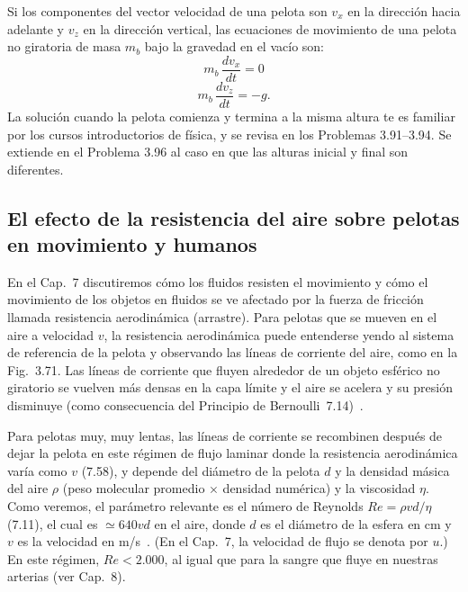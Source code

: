 \documentclass[12pt]{book}
\begin{document}
Si los componentes del vector velocidad de una pelota son $v_x$ en la dirección hacia adelante y $v_z$ en la dirección vertical, las ecuaciones de movimiento de una pelota no giratoria de masa $m_b$ bajo la gravedad en el vacío son:
\begin{equation}
m_b\,\frac{dv_x}{dt} = 0
\label{eq:3.134}
\end{equation}
\begin{equation}
m_b\,\frac{dv_z}{dt} = -g.
\label{eq:3.135}
\end{equation}
La solución cuando la pelota comienza y termina a la misma altura te es familiar por los cursos introductorios de física, y se revisa en los Problemas 3.91--3.94. Se extiende en el Problema 3.96 al caso en que las alturas inicial y final son diferentes.

\subsection{El efecto de la resistencia del aire sobre pelotas en movimiento y humanos}

En el Cap.~7 discutiremos cómo los fluidos resisten el movimiento y cómo el movimiento de los objetos en fluidos se ve afectado por la fuerza de fricción llamada resistencia aerodinámica (arrastre). Para pelotas que se mueven en el aire a velocidad $v$, la resistencia aerodinámica puede entenderse yendo al sistema de referencia de la pelota y observando las líneas de corriente del aire, como en la Fig.~3.71. Las líneas de corriente que fluyen alrededor de un objeto esférico no giratorio se vuelven más densas en la capa límite y el aire se acelera y su presión disminuye (como consecuencia del Principio de Bernoulli~7.14)~\cite{ref36}.

Para pelotas muy, muy lentas, las líneas de corriente se recombinen después de dejar la pelota en este régimen de flujo laminar donde la resistencia aerodinámica varía como $v$ (7.58), y depende del diámetro de la pelota $d$ y la densidad másica del aire $\rho$ (peso molecular promedio $\times$ densidad numérica) y la viscosidad $\eta$. Como veremos, el parámetro relevante es el número de Reynolds $Re = \rho v d / \eta$ (7.11), el cual es $\simeq 640 v d$ en el aire, donde $d$ es el diámetro de la esfera en cm y $v$ es la velocidad en m/s~\cite{ref36}. (En el Cap.~7, la velocidad de flujo se denota por $u$.) En este régimen, $Re < 2.000$, al igual que para la sangre que fluye en nuestras arterias (ver Cap.~8).
\end{document}
